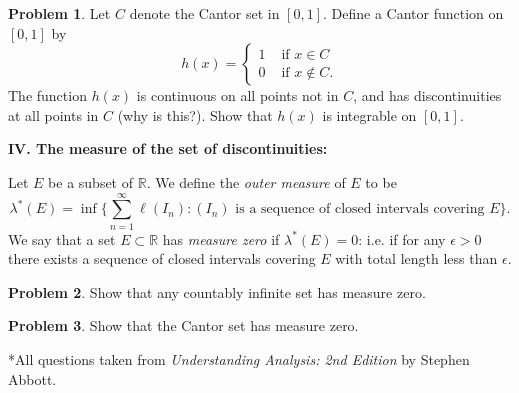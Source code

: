 \documentclass{amsart}
\newcommand{\+}[1]{\ensuremath{\mathbf{#1}}}
\newcommand{\R}{{\mathbb R}}
\theoremstyle{definition}
\newtheorem{prob}{Problem}
\begin{document}
\begin{prob}
 Let $C$ denote the Cantor set in $[0,1]$.
 Define a Cantor function on $[0,1]$ by
 \[
h(x) = \begin{cases}
        1 &\text{ if } x \in C \\
        0 &\text{ if } x \not\in C.
       \end{cases}
 \]
The function $h(x)$ is continuous on all points
not in $C$, and has discontinuities at all points in $C$ (why  is this?).
Show that $h(x)$ is integrable on $[0,1]$.
\end{prob}

\vspace{3mm}
{\bf IV. The measure of the set of discontinuities:}
\vspace{3mm}

Let $E$ be a subset of $\R$.
We define the \emph{outer measure} of $E$ to be
\[
\lambda^*(E) = \inf\{\sum^{\infty}_{n=1} \ell(I_n): (I_n) \text{ is a sequence of closed intervals covering } E\}.
\]
We say that a set $E \subset \R$ has \emph{measure zero} if $\lambda^*(E) = 0$: i.e. if
for any $\epsilon > 0$
there exists a sequence of closed intervals covering $E$ with total length less than $\epsilon$. 

\begin{prob}
 Show that any countably infinite set has measure zero.
\end{prob}

\begin{prob}
 Show that the Cantor set has measure zero.
\end{prob}


\vspace{5mm}

*All questions taken from \emph{Understanding Analysis: 2nd Edition} by Stephen Abbott.
\end{document}
